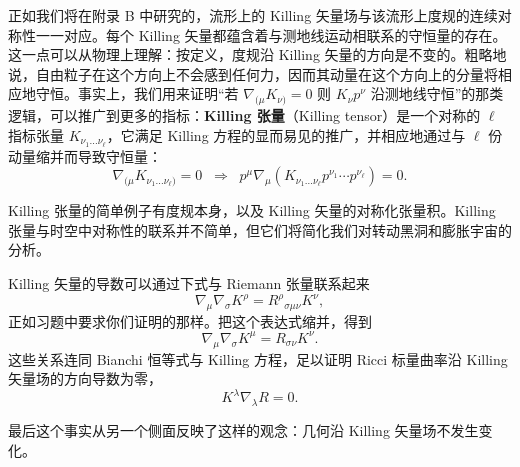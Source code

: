 正如我们将在附录 B 中研究的，流形上的 Killing 矢量场与该流形上度规的连续对称性一一对应。每个 Killing 矢量都蕴含着与测地线运动相联系的守恒量的存在。这一点可以从物理上理解：按定义，度规沿 Killing 矢量的方向是不变的。粗略地说，自由粒子在这个方向上不会感到任何力，因而其动量在这个方向上的分量将相应地守恒。事实上，我们用来证明“若 $\nabla_{(\mu}K_{\nu)} = 0$ 则 $K_\nu p^\nu$ 沿测地线守恒”的那类逻辑，可以推广到更多的指标：\textbf{Killing 张量}（Killing tensor）是一个对称的 $\ell$ 指标张量 $K_{\nu_1\ldots\nu_\ell}$，它满足 Killing 方程的显而易见的推广，并相应地通过与 $\ell$ 份动量缩并而导致守恒量：
\begin{equation*}
\nabla_{(\mu}K_{\nu_1\ldots\nu_\ell)} = 0 \;\;\Rightarrow\;\; p^\mu\nabla_\mu(K_{\nu_1\ldots\nu_\ell}p^{\nu_1}\cdots p^{\nu_\ell}) = 0.
\tag{3.175}
\end{equation*}

Killing 张量的简单例子有度规本身，以及 Killing 矢量的对称化张量积。Killing 张量与时空中对称性的联系并不简单，但它们将简化我们对转动黑洞和膨胀宇宙的分析。

Killing 矢量的导数可以通过下式与 Riemann 张量联系起来
\begin{equation*}
\nabla_\mu\nabla_\sigma K^\rho = R^\rho{}_{\sigma\mu\nu}K^\nu,
\tag{3.176}
\end{equation*}
正如习题中要求你们证明的那样。把这个表达式缩并，得到
\begin{equation*}
\nabla_\mu\nabla_\sigma K^\mu = R_{\sigma\nu}K^\nu.
\tag{3.177}
\end{equation*}
这些关系连同 Bianchi 恒等式与 Killing 方程，足以证明 Ricci 标量曲率沿 Killing 矢量场的方向导数为零，
\begin{equation*}
K^\lambda\nabla_\lambda R = 0.
\tag{3.178}
\end{equation*}

最后这个事实从另一个侧面反映了这样的观念：几何沿 Killing 矢量场不发生变化。

